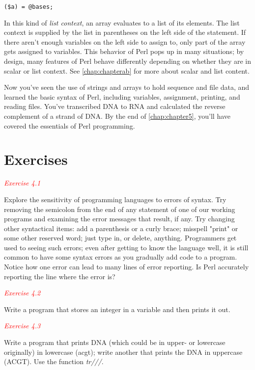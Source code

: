 \begin{lstlisting}
($a) = @bases;
\end{lstlisting}

In this kind of \textit{list context}, an array evaluates to a list of its elements. The list context is supplied by the list in parentheses on the left side of the statement. If there aren't enough variables on the left side to assign to, only part of the array gets assigned to variables.  This behavior of Perl pops up in many situations; by design, many features of Perl behave differently depending on whether they are in scalar or list context. See \autoref{chap:chapterab} for more about scalar and list content.

Now you've seen the use of strings and arrays to hold sequence and file data, and learned the basic syntax of Perl, including variables, assignment, printing, and reading files. You've transcribed DNA to RNA and calculated the reverse complement of a strand of DNA. By the end of \autoref{chap:chapter5}, you'll have covered the essentials of Perl programming. 

\section{Exercises}
\textcolor{red}{\textit{Exercise 4.1}}
\begin{adjustwidth}{1cm}{}
Explore the sensitivity of programming languages to errors of syntax.  Try removing the semicolon from the end of any statement of one of our working programs and examining the error messages that result, if any.  Try changing other syntactical items: add a parenthesis or a curly brace; misspell "print" or some other reserved word; just type in, or delete, anything. Programmers get used to seeing such errors; even after getting to know the language well, it is still common to have some syntax errors as you gradually add code to a program. Notice how one error can lead to many lines of error reporting. Is Perl accurately reporting the line where the error is? 
\end{adjustwidth}

\textcolor{red}{\textit{Exercise 4.2}}
\begin{adjustwidth}{1cm}{}
Write a program that stores an integer in a variable and then prints it out. 
\end{adjustwidth}

\textcolor{red}{\textit{Exercise 4.3}}
\begin{adjustwidth}{1cm}{}
Write a program that prints DNA (which could be in upper- or lowercase originally) in lowercase (acgt); write another that prints the DNA in uppercase (ACGT). Use the function \textit{tr///}. 
\end{adjustwidth}

